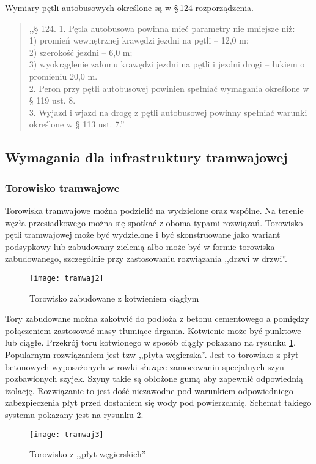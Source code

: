 \documentclass[twoside,12pt]{article}
\begin{document}
	Wymiary pętli autobusowych określone są w §\,124 rozporządzenia. 
	\begin{quote}
	,,§ 124. 1. Pętla autobusowa powinna mieć parametry nie mniejsze niż: \\
1) promień wewnętrznej krawędzi jezdni na pętli – 12,0 m; \\
2) szerokość jezdni – 6,0 m; \\
3) wyokrąglenie załomu krawędzi jezdni na pętli i jezdni drogi – łukiem o promieniu 20,0 m. \\
2. Peron przy pętli autobusowej powinien spełniać wymagania określone w § 119 ust. 8. \\
3. Wyjazd i wjazd na drogę z pętli autobusowej powinny spełniać warunki określone w § 113 ust. 7.''
	\end{quote}
	
	\subsection{Wymagania dla infrastruktury tramwajowej}	
	
	\subsubsection{Torowisko tramwajowe}
	Torowiska tramwajowe można podzielić na wydzielone oraz wspólne. Na terenie węzła przesiadkowego można się spotkać z oboma typami rozwiązań. Torowisko pętli tramwajowej może być wydzielone i być skonstruowane jako wariant podsypkowy lub zabudowany zielenią albo może być w formie torowiska zabudowanego, szczególnie przy zastosowaniu rozwiązania ,,drzwi w drzwi''. 
	\begin{figure}[H]
		\centering
		\texttt{[image: tramwaj2]}\\
		\caption{Torowisko zabudowane z kotwieniem ciągłym}
		\label{tramwaj2}
	\end{figure}
	
	Tory zabudowane można zakotwić do podłoża z betonu cementowego a pomiędzy połączeniem zastosować masy tłumiące drgania. Kotwienie może być punktowe lub ciągłe. Przekrój toru kotwionego w sposób ciągły pokazano na rysunku \ref{tramwaj2}. Popularnym rozwiązaniem jest tzw ,,płyta węgierska''. Jest to torowisko z płyt betonowych wyposażonych w rowki służące zamocowaniu specjalnych szyn pozbawionych szyjek. Szyny takie są obłożone gumą aby zapewnić odpowiednią izolację. Rozwiązanie to jest dość niezawodne pod warunkiem odpowiedniego zabezpieczenia płyt przed dostaniem się wody pod powierzchnię. Schemat takiego systemu pokazany jest na rysunku \ref{tramwaj3}.
	\begin{figure}[H]
		\centering
		\texttt{[image: tramwaj3]}\\
		\caption{Torowisko z ,,płyt węgierskich''}
		\label{tramwaj3}
	\end{figure}
	
\end{document}
